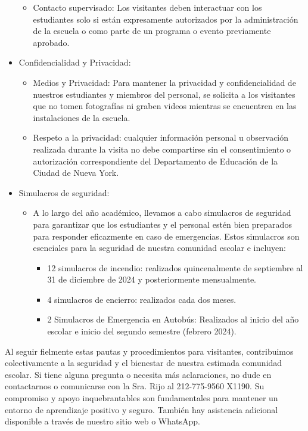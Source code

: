 \documentclass[12pt,letterpaper]{article}
\begin{document}
\begin{itemize}
\begin{itemize}
		\item Contacto supervisado: Los visitantes deben interactuar con los estudiantes solo si están expresamente autorizados por la administración de la escuela o como parte de un programa o evento previamente aprobado.
		\end{itemize}
	\item Confidencialidad y Privacidad:
		\begin{itemize}
		\item Medios y Privacidad: Para mantener la privacidad y confidencialidad de nuestros estudiantes y miembros del personal, se solicita a los visitantes que no tomen fotografías ni graben videos mientras se encuentren en las instalaciones de la escuela.
		\item Respeto a la privacidad: cualquier información personal u observación realizada durante la visita no debe compartirse sin el consentimiento o autorización correspondiente del Departamento de Educación de la Ciudad de Nueva York.
		\end{itemize}
	\item Simulacros de seguridad:
		\begin{itemize}
		\item A lo largo del año académico, llevamos a cabo simulacros de seguridad para garantizar que los estudiantes y el personal estén bien preparados para responder eficazmente en caso de emergencias. Estos simulacros son esenciales para la seguridad de nuestra comunidad escolar e incluyen:
			\begin{itemize}
			\item 12 simulacros de incendio: realizados quincenalmente de septiembre al 31 de diciembre de 2024 y posteriormente mensualmente.
			\pagebreak
\vspace*{1.5cm}
			\item 4 simulacros de encierro: realizados cada dos meses.
			\item 2 Simulacros de Emergencia en Autobús: Realizados al inicio del año escolar e inicio del segundo semestre (febrero 2024).
			\end{itemize}
		\end{itemize}
\end{itemize}

Al seguir fielmente estas pautas y procedimientos para visitantes, contribuimos colectivamente a la seguridad y el bienestar de nuestra estimada comunidad escolar. Si tiene alguna pregunta o necesita más aclaraciones, no dude en contactarnos o comunicarse con la Sra. Rijo al 212-775-9560 X1190. Su compromiso y apoyo inquebrantables son fundamentales para mantener un entorno de aprendizaje positivo y seguro. También hay asistencia adicional disponible a través de nuestro sitio web o WhatsApp.
\end{document}
